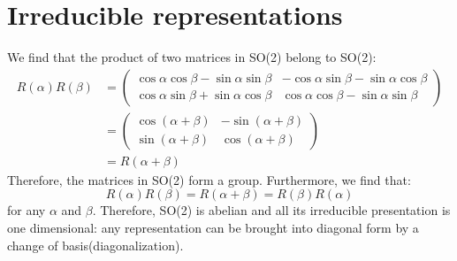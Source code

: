 \documentclass{amsart}
\theoremstyle{remark}
\theoremstyle{remark}
\theoremstyle{definition}
\begin{document}
\vspace{10pt}
\section*{Irreducible representations}

We find that the product of two matrices in SO(2) belong to SO(2):
\begin{align*}
    R(\alpha) R(\beta) &= \left(\begin{matrix}
        \cos\alpha\cos\beta - \sin\alpha\sin\beta & -\cos\alpha\sin\beta - \sin\alpha\cos\beta \\ 
        \cos\alpha\sin\beta + \sin\alpha\cos\beta & \cos\alpha\cos\beta - \sin\alpha\sin\beta
    \end{matrix}\right) \\
    &= \left(\begin{matrix}
        \cos(\alpha + \beta) & -\sin(\alpha + \beta) \\ \sin(\alpha + \beta) & \cos(\alpha + \beta)
    \end{matrix}\right) \\
    &= R(\alpha + \beta)
\end{align*}
Therefore, the matrices in SO(2) form a group. Furthermore, we find that:
\begin{equation*}
    R(\alpha) R(\beta) = R(\alpha + \beta) = R(\beta)R(\alpha) 
\end{equation*}
for any $\alpha$ and $\beta$. Therefore, SO(2) is abelian and all its irreducible presentation 
is one dimensional: any representation can be brought into diagonal form by a change 
of basis(diagonalization).

\vspace{10pt}
\end{document}
